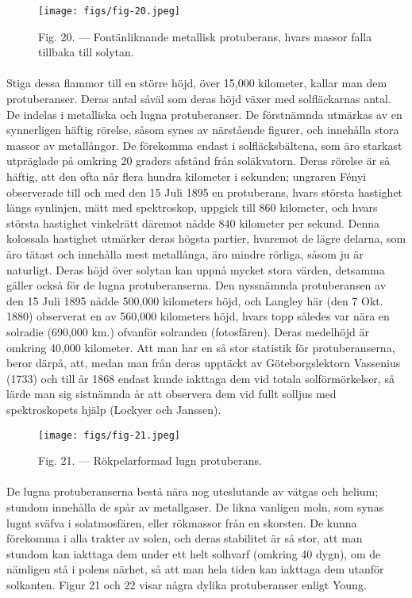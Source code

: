 \documentclass[a4paper, 12pt, oneside, swedish]{article}
\begin{document}
\begin{figure}[H]
\centering
\texttt{[image: figs/fig-20.jpeg]}
\caption{Fig. 20. --- Fontänliknande metallisk protuberans, hvars massor falla tillbaka till solytan.}
\end{figure}
\paragraph{}
Stiga dessa flammor till en större höjd, över 15,000 kilometer, kallar man dem protuberanser. Deras antal såväl som deras höjd växer med solfläckarnas antal. De indelas i metalliska och lugna protuberanser. De förstnämnda utmärkas av en synnerligen häftig rörelse, såsom synes av närstående figurer, och innehålla stora massor av metallångor. De förekomma endast i solfläcksbältena, som äro starkast utpräglade på omkring 20 graders afstånd från soläkvatorn. Deras rörelse är så häftig, att den ofta når flera hundra kilometer i sekunden; ungraren Fényi observerade till och med den 15 Juli 1895 en protuberans, hvars största hastighet längs synlinjen, mätt med spektroskop, uppgick till 860 kilometer, och hvars största hastighet vinkelrätt däremot nådde 840 kilometer per sekund. Denna kolossala hastighet utmärker deras högsta partier, hvaremot de lägre delarna, som äro tätast och innehålla mest metallånga, äro mindre rörliga, såsom ju är naturligt. Deras höjd över solytan kan uppnå mycket stora värden, detsamma gäller också för de lugna protuberanserna. Den nyssnämnda protuberansen av den 15 Juli 1895 nådde 500,000 kilometers höjd, och Langley här (den 7 Okt. 1880) observerat en av 560,000 kilometers höjd, hvars topp således var nära en solradie (690,000 km.) ofvanför solranden (fotosfären). Deras medelhöjd är omkring 40,000 kilometer. Att man har en så stor statistik för protuberanserna, beror därpå, att, medan man från deras upptäckt av Göteborgslektorn Vassenius (1733) och till år 1868 endast kunde iakttaga dem vid totala solförmörkelser, så lärde man sig sistnämnda år att observera dem vid fullt solljus med spektroskopets hjälp (Lockyer och Janssen).

\begin{figure}[H]
\centering
\texttt{[image: figs/fig-21.jpeg]}
\caption{Fig. 21. --- Rökpelarformad lugn protuberans.}
\end{figure}
\paragraph{}
De lugna protuberanserna bestå nära nog uteslutande av vätgas och helium; stundom innehålla de spår av metallgaser. De likna vanligen moln, som synas lugnt sväfva i solatmosfären, eller rökmassor från en skorsten. De kunna förekomma i alla trakter av solen, och deras stabilitet är så stor, att man stundom kan iakttaga dem under ett helt solhvarf (omkring 40 dygn), om de nämligen stå i polens närhet, så att man hela tiden kan iakttaga dem utanför solkanten. Figur 21 och 22 visar några dylika protuberanser enligt Young.
\end{document}
